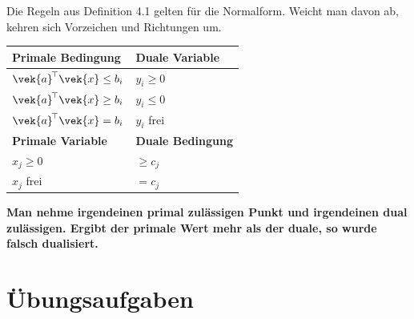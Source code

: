 \begin{warnung}
Die Regeln aus Definition 4.1 gelten für die Normalform. Weicht man davon ab, kehren sich Vorzeichen und Richtungen um.

\begin{center}
{\small
\renewcommand{\arraystretch}{1.5}
\begin{tabular}{@{}P{3.0cm}P{5.6cm}@{}}
\toprule
\textbf{Primale Bedingung} & \textbf{Duale Variable}\\
\midrule
$\vek{a}^{\!\top}\vek{x} \le b_i$ & $y_i \ge 0$\\
$\vek{a}^{\!\top}\vek{x} \ge b_i$ & $y_i \le 0$\\
$\vek{a}^{\!\top}\vek{x} = b_i$ & $y_i$ \textcolor{mittel}{frei}\\
\midrule
\textbf{Primale Variable} & \textbf{Duale Bedingung}\\
\midrule
$x_j \ge 0$ & $\ge c_j$\\
$x_j$ frei & $= c_j$\\
\bottomrule
\end{tabular}}
\end{center}

\begin{center}
\begin{minipage}{0.88\textwidth}
\end{minipage}
\end{center}

\begin{center}
\begin{minipage}{0.9\textwidth}
\textbf{Man nehme irgendeinen primal zulässigen Punkt und irgendeinen dual zulässigen. Ergibt der primale Wert mehr als der duale, so wurde falsch dualisiert.}
\end{minipage}
\end{center}
\end{warnung}

\section{Übungsaufgaben}

